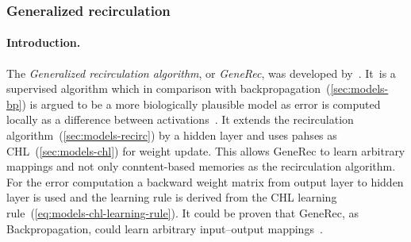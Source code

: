 \subsubsection{Generalized recirculation}
\label{sec:models-generec} 

\paragraph{Introduction.} 
The \emph{Generalized recirculation algorithm}, or \emph{GeneRec}, was developed by~\citet{o1996bio}. It~is a supervised algorithm which in comparison with backpropagation~(\ref{sec:models-bp}) is argued to be a more biologically plausible model as error is computed locally as a difference between activations~\citep{o1998six, o2001generalization, da2011advances, schneider2009application}. It extends the recirculation algorithm~(\ref{sec:models-recirc}) by a hidden layer and uses pahses as CHL~(\ref{sec:models-chl}) for weight update. This allows GeneRec to learn arbitrary mappings and not only conntent-based memories as the recirculation algorithm. For the error computation a backward weight matrix from output layer to hidden layer is used and the learning rule is derived from the CHL learning rule~(\ref{eq:models-chl-learning-rule}). It could be proven that GeneRec, as Backpropagation, could learn arbitrary input--output mappings~\citep{o1996bio}. 

